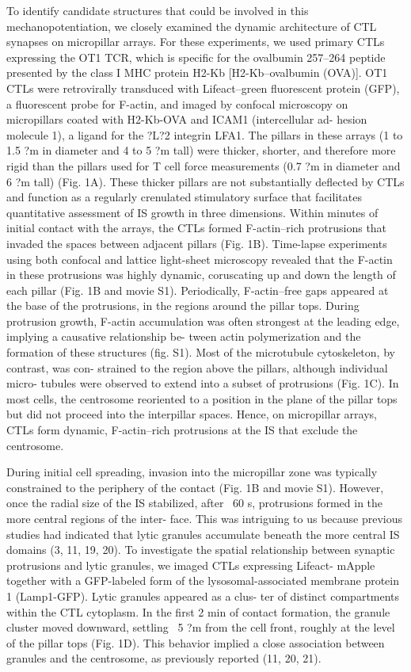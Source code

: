 To identify candidate structures that could be involved in this mechanopotentiation, we closely examined the dynamic architecture of CTL synapses on micropillar arrays. For these experiments, we used primary CTLs expressing the OT1 TCR, which is specific for the ovalbumin 257–264 peptide presented by the class I MHC protein H2-Kb [H2-Kb–ovalbumin (OVA)]. OT1 CTLs were retrovirally transduced with Lifeact–green fluorescent protein (GFP), a fluorescent probe for F-actin, and imaged by confocal microscopy on micropillars coated with H2-Kb-OVA and ICAM1 (intercellular ad- hesion molecule 1), a ligand for the ?L?2 integrin LFA1. The pillars in these arrays (1 to 1.5 ?m in diameter and 4 to 5 ?m tall) were thicker, shorter, and therefore more rigid than the pillars used for T cell force measurements (0.7 ?m in diameter and 6 ?m tall) (Fig. 1A). These thicker pillars are not substantially deflected by CTLs and function as a regularly crenulated stimulatory surface that facilitates quantitative assessment of IS growth in three dimensions.
Within minutes of initial contact with the arrays, the CTLs formed F-actin–rich protrusions that invaded the spaces between adjacent pillars (Fig. 1B). Time-lapse experiments using both confocal and lattice light-sheet microscopy revealed that the F-actin in these protrusions was highly dynamic, coruscating up and down the length of each pillar (Fig. 1B and movie S1). Periodically, F-actin–free gaps appeared at the base of the protrusions, in the regions around the pillar tops. During protrusion growth, F-actin accumulation was often strongest at the leading edge, implying a causative relationship be- tween actin polymerization and the formation of these structures (fig. S1). Most of the microtubule cytoskeleton, by contrast, was con- strained to the region above the pillars, although individual micro- tubules were observed to extend into a subset of protrusions (Fig. 1C). In most cells, the centrosome reoriented to a position in the plane of the pillar tops but did not proceed into the interpillar spaces. Hence, on micropillar arrays, CTLs form dynamic, F-actin–rich protrusions at the IS that exclude the centrosome.

During initial cell spreading, invasion into the micropillar zone was typically constrained to the periphery of the contact (Fig. 1B and movie S1). However, once the radial size of the IS stabilized, after ~60 s, protrusions formed in the more central regions of the inter- face. This was intriguing to us because previous studies had indicated that lytic granules accumulate beneath the more central IS domains (3, 11, 19, 20). To investigate the spatial relationship between synaptic protrusions and lytic granules, we imaged CTLs expressing Lifeact- mApple together with a GFP-labeled form of the lysosomal-associated membrane protein 1 (Lamp1-GFP). Lytic granules appeared as a clus- ter of distinct compartments within the CTL cytoplasm. In the first 2 min of contact formation, the granule cluster moved downward, settling ~5 ?m from the cell front, roughly at the level of the pillar tops (Fig. 1D). This behavior implied a close association between granules and the centrosome, as previously reported (11, 20, 21).

